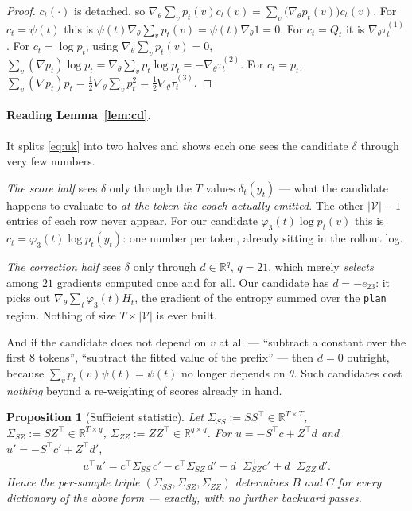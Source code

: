 \documentclass{article}
\theoremstyle{plain}
\newtheorem{proposition}[theorem]{Proposition}
\theoremstyle{definition}
\begin{document}
\begin{proof}
$c_t(\cdot)$ is detached, so $\nabla_\theta\sum_v p_t(v)c_t(v)=\sum_v\big(\nabla_\theta p_t(v)\big)c_t(v)$.
For $c_t=\psi(t)$ this is $\psi(t)\nabla_\theta\!\sum_v p_t(v)=\psi(t)\nabla_\theta 1=0$.
For $c_t=Q_t$ it is $\nabla_\theta\tau^{(1)}_t$.
For $c_t=\log p_t$, using $\nabla_\theta\sum_v p_t(v)=0$,
$\sum_v(\nabla p_t)\log p_t=\nabla_\theta\sum_v p_t\log p_t=-\nabla_\theta\tau^{(2)}_t$.
For $c_t=p_t$, $\sum_v(\nabla p_t)p_t=\tfrac12\nabla_\theta\sum_v p_t^2=\tfrac12\nabla_\theta\tau^{(3)}_t$.
\end{proof}

\paragraph{Reading Lemma~\ref{lem:cd}.} It splits \eqref{eq:uk} into two halves and shows each one sees
the candidate $\delta$ through very few numbers.

\emph{The score half} sees $\delta$ only through the $T$ values $\delta_t(y_t)$ --- what the candidate
happens to evaluate to \emph{at the token the coach actually emitted}. The other $|\mathcal{V}|-1$
entries of each row never appear. For our candidate $\varphi_3(t)\log p_t(v)$ this is
$c_t=\varphi_3(t)\log p_t(y_t)$: one number per token, already sitting in the rollout log.

\emph{The correction half} sees $\delta$ only through $d\in\mathbb{R}^{q}$, $q=21$, which merely
\emph{selects} among $21$ gradients computed once and for all. Our candidate has $d=-e_{23}$: it picks
out $\nabla_\theta\sum_t\varphi_3(t)H_t$, the gradient of the entropy summed over the \texttt{plan}
region. Nothing of size $T\times|\mathcal{V}|$ is ever built.

And if the candidate does not depend on $v$ at all --- ``subtract a constant over the first $8$
tokens'', ``subtract the fitted value of the prefix'' --- then $d=0$ outright, because
$\sum_v p_t(v)\psi(t)=\psi(t)$ no longer depends on $\theta$. Such candidates cost \emph{nothing}
beyond a re-weighting of scores already in hand.

\begin{proposition}[Sufficient statistic]\label{prop:suff}
Let $\Sigma_{SS}:=SS^\top\in\mathbb{R}^{T\times T}$, $\Sigma_{SZ}:=SZ^\top\in\mathbb{R}^{T\times q}$,
$\Sigma_{ZZ}:=ZZ^\top\in\mathbb{R}^{q\times q}$. For $u=-S^\top c+Z^\top d$ and $u'=-S^\top c'+Z^\top d'$,
\begin{align}
u^\top u'=c^\top\Sigma_{SS}\,c'-c^\top\Sigma_{SZ}\,d'-d^\top\Sigma_{SZ}^\top c'+d^\top\Sigma_{ZZ}\,d'.
\end{align}
Hence the per-sample triple $(\Sigma_{SS},\Sigma_{SZ},\Sigma_{ZZ})$ determines $B$ and $C$ for
\emph{every} dictionary of the above form --- exactly, with no further backward passes.
\end{proposition}
\end{document}
